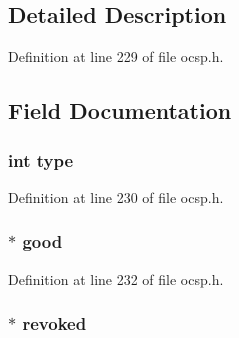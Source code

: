\subsection{Detailed Description}


Definition at line 229 of file ocsp.\+h.



\subsection{Field Documentation}
\subsubsection[{\texorpdfstring{type}{type}}]{\setlength{\rightskip}{0pt plus 5cm}int type}\hypertarget{structocsp__cert__status__st_ac765329451135abec74c45e1897abf26}{}\label{structocsp__cert__status__st_ac765329451135abec74c45e1897abf26}


Definition at line 230 of file ocsp.\+h.

\subsubsection[{\texorpdfstring{good}{good}}]{$\ast$ good}\hypertarget{structocsp__cert__status__st_a33f99b2f2ae4656498057fa8b147e971}{}\label{structocsp__cert__status__st_a33f99b2f2ae4656498057fa8b147e971}


Definition at line 232 of file ocsp.\+h.

\subsubsection[{\texorpdfstring{revoked}{revoked}}]{$\ast$ revoked}\hypertarget{structocsp__cert__status__st_a6194de371b0b43a642687367bda514d6}{}\label{structocsp__cert__status__st_a6194de371b0b43a642687367bda514d6}


